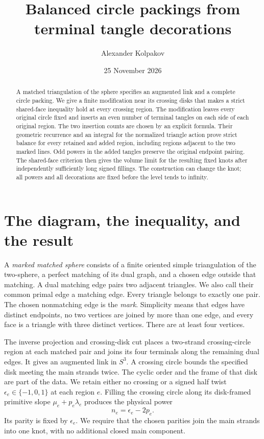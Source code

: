 \documentclass[11pt]{article}
\title{Balanced circle packings from terminal tangle decorations}
\author{Alexander Kolpakov}\date{25 November 2026}
\numberwithin{equation}{section}
\theoremstyle{definition}
\begin{document}
\maketitle

\begin{abstract}
A matched triangulation of the sphere specifies an augmented link and
a complete circle packing. We give a finite modification near its
crossing disks that makes a strict shared-face inequality hold at
every crossing region. The modification leaves every original circle
fixed and inserts an even number of terminal tangles on each side of
each original region. The two insertion counts are chosen by an
explicit formula. Their geometric recurrence and an integral for the
normalized triangle action prove strict balance for every retained
and added region, including regions adjacent to the two marked lines.
Odd powers in the added tangles preserve the original endpoint
pairing. The shared-face criterion then gives the volume limit for
the resulting fixed knots after independently sufficiently long
signed fillings. The construction can change the knot; all powers
and all decorations are fixed before the level tends to infinity.
\end{abstract}

\section{The diagram, the inequality, and the result}

A \emph{marked matched sphere} consists of a finite oriented simple
triangulation of the two-sphere, a perfect matching of its dual
graph, and a chosen edge outside that matching. A dual matching edge
pairs two adjacent triangles. We also call their common primal edge
a matching edge. Every triangle belongs to exactly one pair.
The chosen nonmatching edge is the \emph{mark}.
Simplicity means that edges have distinct endpoints, no two vertices
are joined by more than one edge, and every face is a triangle with
three distinct vertices. There are at least four vertices.

The inverse projection and crossing-disk cut places a two-strand
crossing-circle region at each matched pair and joins its four
terminals along the remaining dual edges. It gives an augmented
link in \(S^3\). A crossing circle bounds the specified disk meeting
the main strands twice. The cyclic order and the frame of that disk
are part of the data. We retain either no crossing or a signed half
twist \(\epsilon_e\in\{-1,0,1\}\) at each region \(e\).
Filling the crossing circle along its disk-framed primitive slope
\(\mu_e+p_e\lambda_e\) produces the physical power
\begin{equation}\label{td:powers}
 n_e=\epsilon_e-2p_e .
\end{equation}
Its parity is fixed by \(\epsilon_e\). We require that the chosen
parities join the main strands into one knot, with no additional
closed main component.
\end{document}
